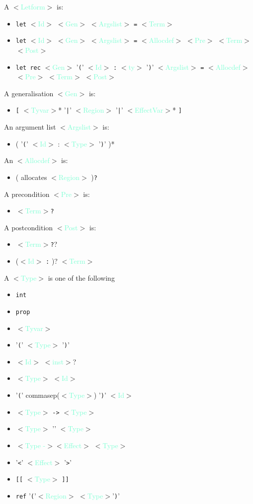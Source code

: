 \documentclass[a4paper]{scrreprt}
\newcommand{\cat}[1]{$<$\textcolor{Aquamarine}{#1}$>$}
\begin{document}
A \cat{Letform} is:
\begin{itemize}
  \item {\tt let} \cat{Id} \cat{Gen} \cat{Argslist} {\tt =} \cat{Term}
  \item {\tt let} \cat{Id} \cat{Gen} \cat{Argslist} {\tt =} \cat{Allocdef} {\cat{Pre}} \cat{Term} {\cat{Post}}
  \item {\tt let rec} \cat{Gen} '{\tt (}' \cat{Id} {\tt :} \cat{ty} '{\tt )}'
    \cat{Argslist} {\tt =} \cat{Allocdef} {\cat{Pre}} \cat{Term} {\cat{Post}}
\end{itemize}

A generalisation \cat{Gen} is:
\begin{itemize}
  \item {\tt [} \cat{Tyvar}* '{\tt |}' \cat{Region} '{\tt |}' \cat{EffectVar}*
    {\tt ]}
\end{itemize}

An argument list \cat{Argslist} is:
\begin{itemize}
  \item ( '{\tt (}' \cat{Id} : \cat{Type} '{\tt )}' )*
\end{itemize}

An \cat{Allocdef} is:
\begin{itemize}
  \item ( allocates \cat{Region} ){\tt ?}
\end{itemize}

A precondition \cat{Pre} is: 
\begin{itemize}
  \item \cat{Term}{\tt ?}
\end{itemize}

A postcondition \cat{Post} is: 
\begin{itemize}
  \item \cat{Term}{\tt ?}? 
  \item (\cat{Id} {\tt :} )? \cat{Term}
\end{itemize}
  

A \cat{Type} is one of the following
\begin{itemize}
  \item {\tt int}
  \item {\tt prop}
  \item \cat{Tyvar}
  \item '{\tt (}' \cat{Type} '{\tt )}'
  \item \cat{Id} \cat{inst}?
  \item \cat{Type} \cat{Id}
  \item '{\tt (}' commasep(\cat{Type}) '{\tt )}' \cat{Id}
  \item \cat{Type} {\tt ->} \cat{Type}
  \item \cat{Type} '{\tt *}' \cat{Type}
  \item \cat{Type -}\cat{Effect} \cat{Type}
  \item '{\tt <}' \cat{Effect} '{\tt >}'
  \item {\tt [[} \cat{Type} {\tt ]]}
  \item {\tt ref} '{\tt (}'\cat{Region} \cat{Type}'{\tt )}'
\end{itemize}
\end{document}
